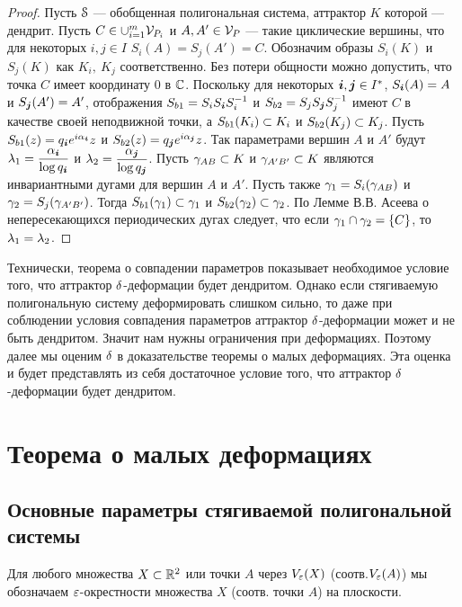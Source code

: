 \begin{proof}
Пусть ${\EuScript S}$ --- обобщенная полигональная система, аттрактор $K$ которой --- дендрит. 
Пусть $C \in\cup_{i=1}^m  {\mathcal V}_{P_i}$ и $A,A'\in {\mathcal V}_P$ --- такие циклические вершины, что для некоторых $i,j\in I$  $S_i(A)=S_j(A')=C$. 
Обозначим образы $S_i(K)$ и $S_j(K)$ как $K_i,\ K_j$ соответственно. 
Без потери общности можно допустить, что точка $C$ имеет координату $0$ в $\mathbb{C}$. 
Поскольку для некоторых ${\bm{i}},{\bm{j}}\in I^*$, $S_{\bm{i}}(A)=A$ и $S_{\bm{j}}(A')=A'$, отображения $S_{b1}=S_iS_{\bm{i}} S_i^{-1}$ и $S_{b2}=S_jS_{\bm{j}} S_j^{-1}$ имеют $C$  в качестве своей неподвижной точки, а $S_{b1}(K_i)\subset K_i$ и $S_{b2}(K_j)\subset K_j$. 
Пусть $S_{b1}(z)=q_{\bm{i}} e^{i\alpha_{\bm{i}}}z$ и $S_{b2}(z)=q_{\bm{j}} e^{i\alpha_{\bm{j}}}z$. 
Так параметрами вершин $A$ и $A'$ будут $\lambda_1=\dfrac{\alpha_{\bm{i}}}{\log q_{\bm{i}}}$ и  $\lambda_2=\dfrac{\alpha_{\bm{j}}}{\log q_{\bm{j}}}$. 
Пусть $\gamma_{AB}\subset K$ и $\gamma_{A'B'}\subset K$ являются инвариантными дугами для вершин $A$ и $A'$. 
Пусть также  $\gamma_1=S_i(\gamma_{AB})$ и $\gamma_2=S_j(\gamma_{A'B'})$. 
Тогда $S_{b1}(\gamma_1)\subset \gamma_1$ и $S_{b2}(\gamma_2)\subset \gamma_2$. 
По Лемме В.В. Асеева о непересекающихся периодических дугах \cite[Lemma 3.1]{ATK} следует, что если $\gamma_1\cap\gamma_2=\{C\}$, то $\lambda_1=\lambda_2$.
\end{proof}

Технически, теорема о совпадении параметров показывает необходимое условие того, что аттрактор $\delta$-деформации будет дендритом. 
Однако если стягиваемую полигональную систему деформировать слишком сильно, то даже при соблюдении условия совпадения параметров аттрактор $\delta$-деформации может и не быть дендритом. 
Значит нам нужны ограничения при деформациях. 
Поэтому далее мы оценим $\delta$ в доказательстве теоремы о малых деформациях. 
Эта оценка и будет представлять из себя достаточное условие того, что аттрактор $\delta$-деформации будет дендритом.



\newpage
\section{Теорема о малых деформациях}

\subsection{Основные параметры стягиваемой полигональной системы}\label{parms}

Для любого множества $X\subset\mathbb{R}^2$ или точки $A$ через $V_\varepsilon(X)$ (соотв.$V_\varepsilon(A)$) мы обозначаем $\varepsilon$-окрестности множества $X$ (соотв. точки $A$) на плоскости.\\

